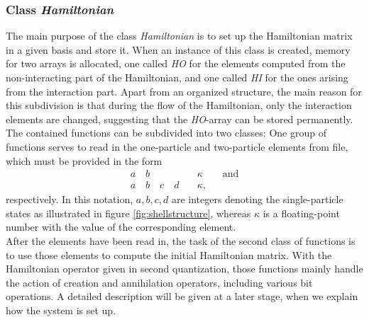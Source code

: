 \subsubsection{Class \textit{Hamiltonian}}
The main purpose of the class \textit{Hamiltonian} is to set up the Hamiltonian matrix in a given basis and store it. When an instance of this class is created, memory for two arrays is allocated, one called \textit{HO} for the elements computed from the non-interacting part of the Hamiltonian, and one called \textit{HI} for the ones arising from the interaction part. Apart from an organized structure, the main reason for this subdivision is that during the flow of the Hamiltonian, only the interaction elements are changed, suggesting that the \textit{HO}-array can be stored permanently.\\
The contained functions can be subdivided into two classes: One group of functions serves to read in the one-particle and two-particle elements from file, which must be provided in the form
\begin{align}
a \quad b \quad &\kappa \qquad \text{and} \label{eq:elements1} \\
a \quad b \quad c \quad d \quad &\kappa,
\label{eq:elements}
\end{align}
respectively. In this notation, $a,b,c,d$ are integers denoting the single-particle states as illustrated in figure \ref{fig:shellstructure}, whereas $\kappa$ is a floating-point number with the value of the corresponding element.\\
After the elements have been read in, the task of the second class of functions is to use those elements to compute the initial Hamiltonian matrix. With the Hamiltonian operator given in second quantization, those functions mainly handle the action of creation and annihilation operators, including various bit operations. A detailed description will be given at a later stage, when we explain how the system is set up.

